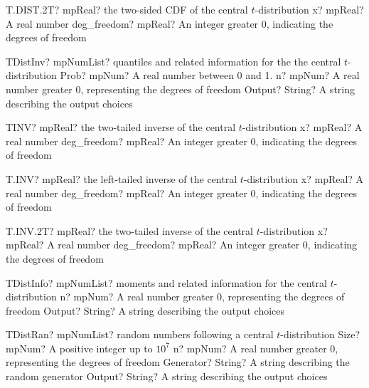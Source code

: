 \documentclass[12pt,a4paper,openany]{book}
\begin{document}
\begin{mpFunctionsExtract}
\mpWorksheetFunctionTwoNotImplemented
{T.DIST.2T? mpReal? the two-sided CDF of the central $t$-distribution}
{x? mpReal? A real number}
{deg\_freedom? mpReal? An integer  greater 0, indicating the degrees of freedom}
\end{mpFunctionsExtract}

\begin{mpFunctionsExtract}
\mpFunctionThreeNotImplemented
{TDistInv? mpNumList? quantiles and related information for the the central $t$-distribution}
{Prob? mpNum? A real number between 0 and 1.}
{n? mpNum? A real number greater 0, representing the degrees of freedom}
{Output? String? A string describing the output choices}
\end{mpFunctionsExtract}

\begin{mpFunctionsExtract}
\mpWorksheetFunctionTwoNotImplemented
{TINV? mpReal? the two-tailed inverse of the central $t$-distribution}
{x? mpReal? A real number}
{deg\_freedom? mpReal? An integer  greater 0, indicating the degrees of freedom}
\end{mpFunctionsExtract}

\begin{mpFunctionsExtract}
\mpWorksheetFunctionTwoNotImplemented
{T.INV? mpReal? the left-tailed inverse of the central $t$-distribution}
{x? mpReal? A real number}
{deg\_freedom? mpReal? An integer  greater 0, indicating the degrees of freedom}
\end{mpFunctionsExtract}

\begin{mpFunctionsExtract}
\mpWorksheetFunctionTwoNotImplemented
{T.INV.2T? mpReal? the two-tailed inverse of the central $t$-distribution}
{x? mpReal? A real number}
{deg\_freedom? mpReal? An integer  greater 0, indicating the degrees of freedom}
\end{mpFunctionsExtract}

\begin{mpFunctionsExtract}
\mpFunctionTwoNotImplemented
{TDistInfo? mpNumList? moments and related information for the central $t$-distribution}
{n? mpNum? A real number greater 0, representing the degrees of freedom}
{Output? String? A string describing the output choices}
\end{mpFunctionsExtract}

\begin{mpFunctionsExtract}
\mpFunctionFourNotImplemented
{TDistRan? mpNumList? random numbers following a central $t$-distribution}
{Size? mpNum? A positive integer up to $10^7$}
{n? mpNum? A real number greater 0, representing the degrees of freedom}
{Generator? String? A string describing the random generator}
{Output? String? A string describing the output choices}
\end{mpFunctionsExtract}
\end{document}

